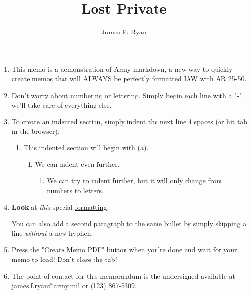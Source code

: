 \documentclass{./latex/armymemo-notikz}
\author{James F. Ryan}\rank{PVT}\branch{IN}
\title{Lost Private}
\begin{document}
\begin{enumerate}
\item This memo is a demonstration of Army markdown, a new way to quickly create memos that will ALWAYS be perfectly formatted IAW with AR 25-50.
\item Don't worry about numbering or lettering. Simply begin each line with a "-", we'll take care of everything else.
\item To create an indented section, simply indent the next line 4 spaces (or hit tab in the browser).
\begin{enumerate}
\item This indented section will begin with (a).
\begin{enumerate}
\item We can indent even further.
\begin{enumerate}
\item We can try to indent further, but it will only change from numbers to letters.
\end{enumerate}
\end{enumerate}
\end{enumerate}
\item \textbf{Look} at \textit{this} special \underline{formatting}.

You can also add a second paragraph to the same bullet by simply skipping a line \textit{without} a new hyphen.
\item Press the "Create Memo PDF" button when you're done and wait for your memo to load! Don't close the tab!
\item The point of contact for this memorandum is the undersigned available at james.f.ryan@army.mil or (123) 867-5309.
\end{enumerate}
\end{document}
